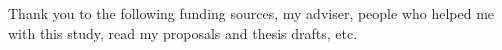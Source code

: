 

Thank you to the following funding sources, my adviser, people who helped me with this study, read my proposals and thesis drafts, etc.